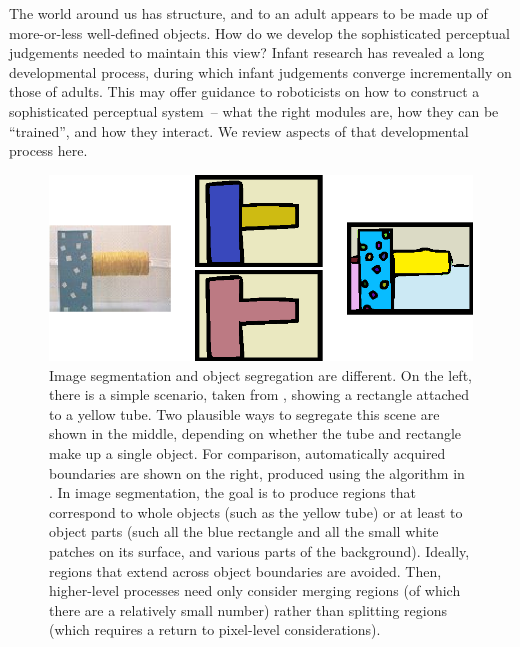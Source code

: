 The world around us has structure, and to an adult appears to be made
up of more-or-less well-defined objects.  How do we develop the
sophisticated perceptual judgements needed to maintain this view?
Infant research has revealed a long developmental process, during
which infant judgements converge incrementally on those of adults.
This may offer guidance to roboticists on how to construct a
sophisticated perceptual system~-- what the right modules are, how
they can be ``trained'', and how they interact.  We review aspects 
of that developmental process here.



\begin{figure}

\centerline{\includegraphics[width=0.75\columnwidth]{fig-seg}}

\caption{
%
Image segmentation and object segregation are different.  On the left,
there is a simple scenario, taken from ,
showing a rectangle attached to a yellow tube.  Two 
plausible ways to segregate this scene are shown in the middle,
depending on whether the tube and rectangle make up a single 
object.
For
comparison, automatically acquired boundaries are shown on the right,
produced using the algorithm in
. 
In image segmentation, the goal is to
produce regions that correspond to whole objects (such as the yellow
tube) or at least to object parts (such all the blue rectangle and all
the small white patches on its surface, and various parts of the
background).  Ideally, regions that extend across object boundaries
are avoided.  Then, higher-level processes need only consider merging
regions (of which there are a relatively small number) rather than
splitting regions (which requires a return to pixel-level
considerations).  
%
%
}

\label{fig:image-segmentation}

\end{figure}


